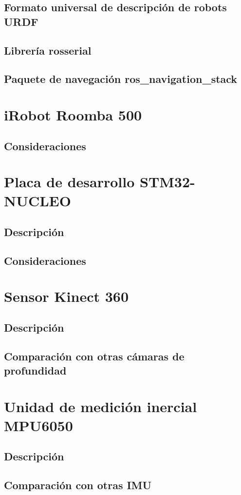 \subsection{Formato universal de descripción de robots URDF}
\subsection{Librería rosserial}
\subsection{Paquete de navegación ros\_navigation\_stack}
\section{iRobot Roomba 500}
\subsection{Consideraciones}
\section{Placa de desarrollo STM32-NUCLEO}
\subsection{Descripción}
\subsection{Consideraciones}
\section{Sensor Kinect 360}
\subsection{Descripción}
\subsection{Comparación con otras cámaras de profundidad}
\section{Unidad de medición inercial MPU6050}
\subsection{Descripción}
\subsection{Comparación con otras IMU}
